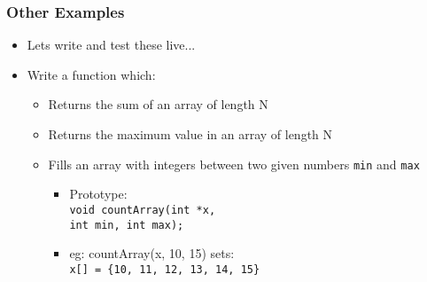 \documentclass[14pt]{beamer}
\begin{document}
\begin{frame}
\frametitle{Other Examples}
\begin{itemize}
\item Lets write and test these live...
\item Write a function which:
	\begin{itemize}	
		\item Returns the sum of an array of length N
		\item Returns the maximum value in an array of length N
		\item Fills an array with integers between two given numbers \texttt{min} and \texttt{max}
			\begin{itemize}
				\item Prototype:\\\texttt{void countArray(int *x,\\\quad \quad \quad \quad int min, int max);}
				\item eg: countArray(x, 10, 15) sets:\\ \texttt{x[] = \{10, 11, 12, 13, 14, 15\}}
			\end{itemize}
	\end{itemize}
\end{itemize}
\end{frame}
\end{document}
